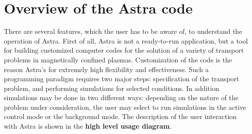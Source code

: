 \vfill\eject
\section{Overview of the Astra code}

There are several features, which the user has to be aware of, to
understand the operation of Astra.
First of all, Astra is not a ready-to-run application, but a tool
for building customized computer codes for the solution of a
variety of transport problems in magnetically confined plasmas.
Customization of the code is the reason Astra's for extremely high
flexibility and effectiveness.
Such a programming paradigm requires two major steps:
specification of the transport problem, and performing simulations for
selected conditions.
In addition simulations may be done in two different ways: 
depending on the nature of the problem under consideration, the user may
select to run simulations in the active control mode or the background
mode. 
The description of the user interaction with Astra is shown in the
{\bf high level usage diagram}.


